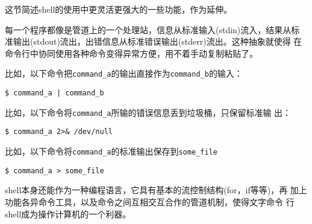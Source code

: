 \documentclass[a4paper]{article}
\begin{document}
这节简述shell的使用中更灵活更强大的一些功能，作为延伸。

每一个程序都像是管道上的一个处理站，信息从标准输入(stdin)流入，结果从标
准输出(stdout)流出，出错信息从标准错误输出(stderr)流出。这种抽象就使得
在命令行中协同使用各种命令变得异常方便，用不着手动复制粘贴了。

比如，以下命令把\verb|command_a|的输出直接作为\verb|command_b|的输入：
\begin{verbatim}
$ command_a | command_b
\end{verbatim}

比如，以下命令将\verb|command_a|所输的错误信息丢到垃圾桶，只保留标准输
出：
\begin{verbatim}
$ command_a 2>& /dev/null
\end{verbatim}

比如，以下命令将\verb|command_a|的标准输出保存到\verb|some_file|
\begin{verbatim}
$ command_a > some_file
\end{verbatim}

shell本身还能作为一种编程语言，它具有基本的流控制结构(for，if等等)，再
加上功能各异命令工具，以及命令之间互相交互合作的管道机制，使得文字命令
行shell成为操作计算机的一个利器。
\end{document}
